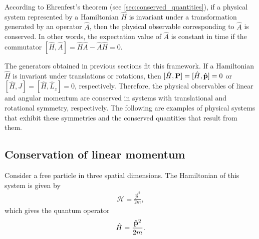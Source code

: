     According to Ehrenfest's theorem (see \cref{sec:conserved_quantities}), if a physical system represented by a Hamiltonian $\hat{H}$ is invariant under a transformation generated by an operator $\hat{A}$, then the physical observable corresponding to $\hat{A}$ is conserved. In other words, the expectation value of $\hat{A}$ is constant in time if the commutator $[\hat{H},\hat{A}] = \hat{H}\hat{A} - \hat{A}\hat{H} = 0$.

    The generators obtained in previous sections fit this framework. If a Hamiltonian $\hat{H}$ is invariant under translations or rotations, then $[\hat{H}, \mathbf{P}] = [\hat{H},\mathbf{\hat{p}}] = 0$ or $[\hat{H}, J] = [\hat{H}, \hat{L}_z] = 0$, respectively. Therefore, the physical observables of linear and angular momentum are conserved in systems with translational and rotational symmetry, respectively. The following are examples of physical systems that exhibit these symmetries and the conserved quantities that result from them.
    
    \subsection{Conservation of linear momentum}
    Consider a free particle in three spatial dimensions. The Hamiltonian of this system is given by
    \begin{align*}
        \mathcal{H} = \frac{\vec{p}^2}{2m},
    \end{align*}
    which gives the quantum operator
    \begin{align*}
        \hat{H} = \frac{\mathbf{\hat{p}}^2}{2m}.
    \end{align*}
    

